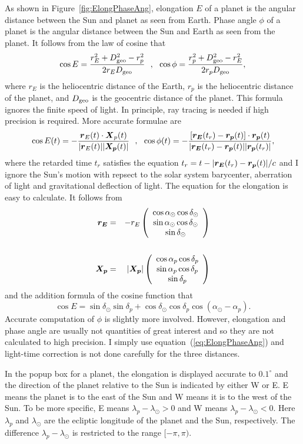 \documentclass[12pt]{article}
\newcommand \beq {\begin{equation}}
\newcommand \eeq {\end{equation}}
\newcommand \beqn {\begin{eqnarray}}
\newcommand \eeqn {\end{eqnarray}}
\newcommand{\ve}[1]{\mbox{\boldmath $#1$}}
\begin{document}
As shown in Figure~\ref{fig:ElongPhaseAng}, elongation $E$ of a planet is the angular 
distance between the Sun and planet as seen from Earth. Phase angle $\phi$ of a planet 
is the angular distance between the Sun and Earth as seen from the planet. It follows 
from the law of cosine that 
\beq
  \cos E = \frac{r_E^2 + D_{\rm geo}^2 - r_p^2}{2 r_E D_{\rm geo}} \ \ , \ \ 
  \cos \phi = \frac{r_p^2 + D_{\rm geo}^2 - r_E^2}{2 r_p D_{\rm geo}} ,
\label{eq:ElongPhaseAng}
\eeq
where $r_E$ is the heliocentric distance of the Earth, $r_p$ is the heliocentric 
distance of the planet, and $D_{\rm geo}$ is the geocentric distance of the 
planet. This formula ignores the finite speed of light. 
In principle, ray tracing is needed if high precision 
is required. More accurate formulae are 
\beq
  \cos E(t) = -\frac{\ve{r}_E(t) \cdot \ve{X}_p(t)}{|\ve{r}_E(t)| |\ve{X_p}(t)|} \ \ , \ \ 
  \cos \phi(t) = -\frac{[\ve{r_E}(t_r)-\ve{r_p}(t)] \cdot \ve{r_p}(t)}
{|\ve{r_E}(t_r)-\ve{r_p}(t)| |\ve{r_p}(t_r)|} ,
\eeq
where the retarded time $t_r$ satisfies the equation 
$t_r=t-|\ve{r_E}(t_r)-\ve{r_p}(t)|/c$ and I ignore 
the Sun's motion with repsect to the solar system barycenter, aberration 
of light and gravitational deflection of light.
The equation for the elongation is easy to calculate. It follows 
from 
\beqn
  \ve{r_E} &=& - r_E \left( \begin{array}{c} 
\cos \alpha_{\odot} \cos \delta_{\odot} \\ 
\sin \alpha_{\odot} \cos \delta_{\odot} \\ 
\sin \delta_{\odot} \end{array} \right) \\ \cr 
\ve{X_p} &=& |\ve{X_p}| \left( \begin{array}{c} 
\cos \alpha_p \cos \delta_p \\ \sin \alpha_p \cos \delta_p \\ \sin \delta_p 
\end{array} \right)
\eeqn
and the addition formula of the cosine function that 
\beq
  \cos E = \sin \delta_{\odot} \sin \delta_p + 
\cos \delta_{\odot} \cos \delta_p \cos (\alpha_{\odot} - \alpha_p) .
\label{eq:Elong}
\eeq
Accurate computation of $\phi$ is slightly more involved. 
However, elongation and phase angle are usually not
quantities of great interest and so they are not calculated to 
high precision. I simply use 
equation~(\ref{eq:ElongPhaseAng}) and light-time correction is not done 
carefully for the three distances. 

In the popup box for a planet, the elongation is displayed accurate to $0.1^\circ$ 
and the direction of the planet relative to the Sun is indicated by either W or E. 
E means the planet is to the east of 
the Sun and W means it is to the west of the Sun. To be more specific, E means 
$\lambda_p-\lambda_{\odot} > 0$ and W means $\lambda_p-\lambda_{\odot} <0$. 
Here $\lambda_p$ and $\lambda_{\odot}$ are the ecliptic longitude of the planet 
and the Sun, respectively. The difference $\lambda_p-\lambda_{\odot}$ is restricted 
to the range $[-\pi,\pi)$.
\end{document}
